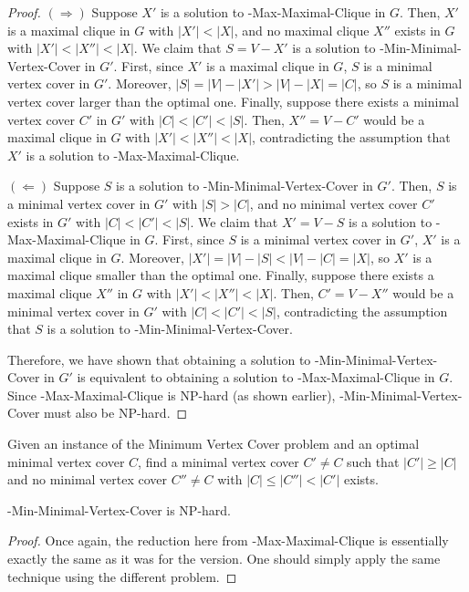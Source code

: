 \begin{proof}
$(\Rightarrow)$ Suppose $X'$ is a solution to \exob{}-Max-Maximal-Clique in $G$. Then, $X'$ is a maximal clique in $G$ with $|X'| < |X|$, and no maximal clique $X''$ exists in $G$ with $|X'| < |X''| < |X|$. We claim that $S = V - X'$ is a solution to \exob{}-Min-Minimal-Vertex-Cover in $G'$. First, since $X'$ is a maximal clique in $G$, $S$ is a minimal vertex cover in $G'$. Moreover, $|S| = |V| - |X'| > |V| - |X| = |C|$, so $S$ is a minimal vertex cover larger than the optimal one. Finally, suppose there exists a minimal vertex cover $C'$ in $G'$ with $|C| < |C'| < |S|$. Then, $X'' = V - C'$ would be a maximal clique in $G$ with $|X'| < |X''| < |X|$, contradicting the assumption that $X'$ is a solution to \exob{}-Max-Maximal-Clique.

$(\Leftarrow)$ Suppose $S$ is a solution to \exob{}-Min-Minimal-Vertex-Cover in $G'$. Then, $S$ is a minimal vertex cover in $G'$ with $|S| > |C|$, and no minimal vertex cover $C'$ exists in $G'$ with $|C| < |C'| < |S|$. We claim that $X' = V - S$ is a solution to \exob{}-Max-Maximal-Clique in $G$. First, since $S$ is a minimal vertex cover in $G'$, $X'$ is a maximal clique in $G$. Moreover, $|X'| = |V| - |S| < |V| - |C| = |X|$, so $X'$ is a maximal clique smaller than the optimal one. Finally, suppose there exists a maximal clique $X''$ in $G$ with $|X'| < |X''| < |X|$. Then, $C' = V - X''$ would be a minimal vertex cover in $G'$ with $|C| < |C'| < |S|$, contradicting the assumption that $S$ is a solution to \exob{}-Min-Minimal-Vertex-Cover.

Therefore, we have shown that obtaining a solution to \exob{}-Min-Minimal-Vertex-Cover in $G'$ is equivalent to obtaining a solution to \exob{}-Max-Maximal-Clique in $G$. Since \exob{}-Max-Maximal-Clique is NP-hard (as shown earlier), \exob{}-Min-Minimal-Vertex-Cover must also be NP-hard.
\end{proof}
\begin{definition}
Given an instance of the Minimum Vertex Cover problem and an optimal minimal vertex cover $C$, find a minimal vertex cover $C' \neq C$ such that $|C'| \geq |C|$ and no minimal vertex cover $C'' \neq C$ with $|C| \leq |C''| < |C'|$ exists.
\end{definition}

\begin{theorem}
\inob{}-Min-Minimal-Vertex-Cover is NP-hard.
\end{theorem}

\begin{proof}
Once again, the reduction here from \inob{}-Max-Maximal-Clique is essentially exactly the same as it was for the \exob{} version. One should simply apply the same technique using the different problem.
\end{proof}


